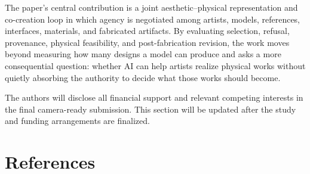 \documentclass{article}
\begin{document}
The paper's central contribution is a joint aesthetic--physical representation
and co-creation loop in which agency is negotiated among artists, models,
references, interfaces, materials, and fabricated artifacts. By evaluating
selection, refusal, provenance, physical feasibility, and post-fabrication
revision, the work moves beyond measuring how many designs a model can produce
and asks a more consequential question: whether AI can help artists realize
physical works without quietly absorbing the authority to decide what those
works should become.

\begin{ack}
The authors will disclose all financial support and relevant competing
interests in the final camera-ready submission. This section will be updated
after the study and funding arrangements are finalized.
\end{ack}

\section*{References}
\end{document}
